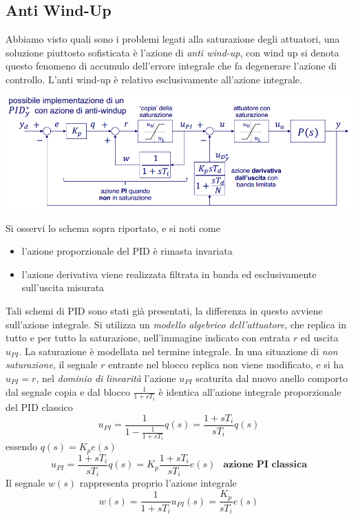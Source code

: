 \documentclass[10pt, letterpaper]{report}
\begin{document}
\subsection{Anti Wind-Up}
Abbiamo visto quali sono i problemi legati alla saturazione degli attuatori, una soluzione piuttosto sofisticata è l'azione di \textit{anti wind-up}, con wind up si denota questo fenomeno di accumulo dell'errore integrale che fa degenerare l'azione di controllo. 
L'anti wind-up è relativo esclusivamente all'azione integrale.\begin{center}
    \includegraphics[width=\textwidth]{images/antiWindUp1.png}
\end{center}
Si osservi lo schema sopra riportato, e si noti come \begin{itemize}
    \item l'azione proporzionale del PID è rimasta invariata 
    \item l'azione derivativa viene realizzata filtrata in banda ed esclusivamente sull'uscita misurata 
\end{itemize}
Tali schemi di PID sono stati già presentati, la differenza in questo avviene sull'azione integrale. Si utilizza un \textit{modello algebrico dell'attuatore}, che replica in tutto e per tutto la saturazione, nell'immagine indicato con entrata $r$ ed uscita $u_{PI}$.\acc 
La saturazione è modellata nel termine integrale.\acc 
In una situazione di \textit{non saturazione}, il segnale $r$ entrante nel blocco replica non viene modificato, e si ha $u_{PI}=r$, nel \textit{dominio di linearità} l'azione $u_{PI}$ scaturita dal nuovo anello comporto dal segnale copia e dal blocco $\frac{1}{1+sT_i}$ è identica all'azione integrale proporzionale del PID classico
$$ u_{PI}=\frac{1}{1-\frac{1}{1+sT_i}}q(s)=\frac{1+sT_i}{sT_i}q(s)$$
essendo $q(s)=K_pe(s)$
$$ u_{PI}=\frac{1+sT_i}{sT_i}q(s)=K_p\frac{1+sT_i}{sT_i}e(s) \ \ \textbf{ azione PI classica}$$
Il segnale $w(s)$ rappresenta proprio l'azione integrale 
$$ w(s)=\frac{1}{1+sT_i}u_{PI}(s)=\frac{K_p}{sT_i}e(s)$$
\end{document}
